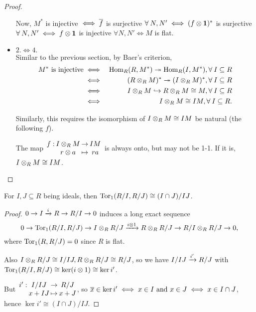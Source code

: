 \begin{prop}
\begin{proof}
\begin{itemize}
        Now, $M^*$ is injective $\iff \overline{f}$ is surjective $\forall N, N' \iff (f \Ot \id)^*$ 
        is surjective $\forall N, N' \iff f \Ot \id$ is injective $\forall N, N' \iff M$ is flat.

      \item $2. \iff 4.$ \\
        Similar to the previous section, by Baer's criterion, \\ 
        \begin{eqnarray*}
          M^*\textrm{ is injective} &\iff& 
          \Hom_R(R, M^*) \onto \Hom_R(I, M^*), \forall I \subseteq R \\
          &\iff& (R \Ot_R M)^* \onto (I \Ot_R M)^*, \forall I \subseteq R \\
          &\iff& I \Ot_R M \toone R \Ot_R M \cong M, \forall I \subseteq R \\
          &\iff& I \Ot_R M \cong IM, \forall I \subseteq R.
        \end{eqnarray*}

        Similarly, this requires the isomorphism of $I \otimes_R M \cong IM$ be 
        natural (the following $f$).

        The map $\deffunc{f}{I \Ot_R M}{IM}{r \Ot a}{ra}$ is always onto, but may not
        be 1-1. If it is, $I \otimes_R M \cong IM$.
    \end{itemize}
  \end{proof}
\end{prop}

\begin{prop}
  For $I, J \subseteq R$ being ideals, then $\operatorname{Tor}_1(R/I, R/J) \cong (I \cap J) / IJ$.
  \begin{proof}
    $0 \to I \xrightarrow{i} R \to R/I \to 0$ induces a long exact sequence
    $$0 \to \operatorname{Tor}_1(R/I, R/J) \to I \otimes_R R/J \xrightarrow{i \otimes 1}
    R \otimes_R R/J \to R/I \otimes_R R/J \to 0,$$
    where $\operatorname{Tor}_1(R, R/J) = 0$ since $R$ is flat.

    Also $I \otimes_R R/J \cong I/IJ, R \otimes_R R/J \cong R/J$, so we have
    $I/IJ \xrightarrow{i'} R/J$ with $\operatorname{Tor}_1(R/I, R/J) \cong \ker(i \otimes 1) \cong \ker i'$.

    But $\deffunc{i'}{I/IJ}{R/J}{x+IJ}{x+J}$, so $\overline{x} \in \ker i' \iff
    x \in I \textrm{ and } x \in J \iff x \in I \cap J$, hence
    $\ker i' \cong (I \cap J) / IJ$.
  \end{proof}
\end{prop}
